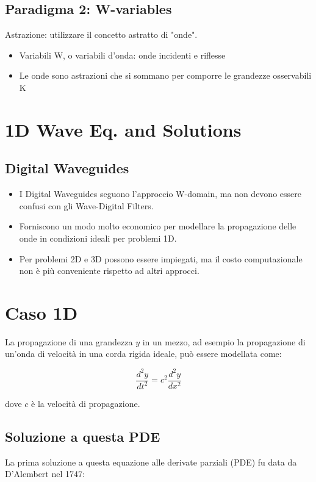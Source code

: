 \subsection{Paradigma 2: W-variables}
Astrazione: utilizzare il concetto astratto di "onde".

\begin{itemize}
  \item Variabili W, o variabili d'onda: onde incidenti e riflesse
  \item Le onde sono astrazioni che si sommano per comporre le grandezze osservabili K
\end{itemize}
\section{1D Wave Eq. and Solutions}

\subsection{Digital Waveguides}

\begin{itemize}
  \item I Digital Waveguides seguono l’approccio W-domain, ma non devono essere confusi con gli Wave-Digital Filters.
  \item Forniscono un modo molto economico per modellare la propagazione delle onde in condizioni ideali per problemi 1D.
  \item Per problemi 2D e 3D possono essere impiegati, ma il costo computazionale non è più conveniente rispetto ad altri approcci.
\end{itemize}

\section{Caso 1D}

La propagazione di una grandezza \( y \) in un mezzo, ad esempio la propagazione di un'onda di velocità in una corda rigida ideale, può essere modellata come:

\[
\frac{d^2 y}{dt^2} = c^2 \frac{d^2 y}{dx^2}
\]

dove \( c \) è la velocità di propagazione.

\subsection{Soluzione a questa PDE}

La prima soluzione a questa equazione alle derivate parziali (PDE) fu data da D'Alembert nel 1747:

